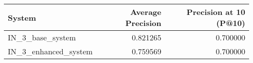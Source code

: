 \begin{tabular}{lrr}
\toprule
System & Average Precision & Precision at 10 (P@10) \\
\midrule
IN_3_base_system & 0.821265 & 0.700000 \\
IN_3_enhanced_system & 0.759569 & 0.700000 \\
\bottomrule
\end{tabular}
